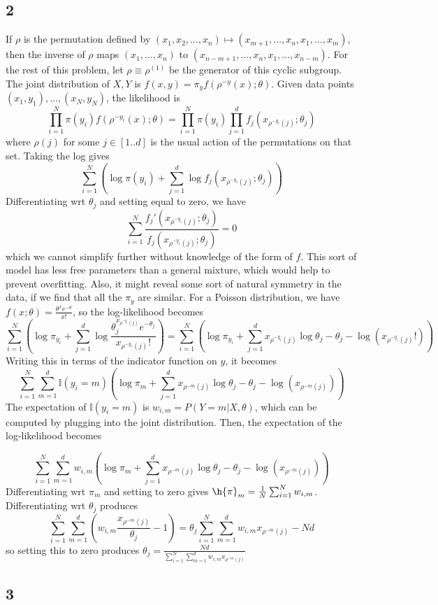\documentclass{article}
\begin{document}
\subsection*{2}
If $\rho$ is the permutation defined by $(x_1,x_2,\ldots,x_n)\mapsto(x_{m+1},\ldots,x_n,x_1,\ldots,x_m)$, then the inverse of $\rho$ maps $(x_1,\ldots,x_n)$ to $(x_{n-m+1},\ldots,x_n,x_1,\ldots,x_{n-m})$. For the rest of this problem, let $\rho\equiv\rho^{(1)}$ be the generator of this cyclic subgroup.
The joint distribution of $X,Y$ is $f(x,y)=\pi_yf(\rho^{-y}(x);\theta)$. Given data points $(x_1,y_1),\ldots,(x_N,y_N)$, the likelihood is
\[\prod_{i=1}^N\pi(y_i)f(\rho^{-y_i}(x);\theta)=\prod_{i=1}^N\pi(y_i)\prod_{j=1}^df_j(x_{\rho^{-y_i}(j)};\theta_j)\]
where $\rho(j)$ for some $j\in[1..d]$ is the usual action of the permutations on that set. Taking the log gives
\[\sum_{i=1}^N\left(\log\pi(y_i)+\sum_{j=1}^d\log f_j(x_{\rho^{-y_i}(j)};\theta_j)\right)\]
Differentiating wrt $\theta_j$ and setting equal to zero, we have
\[\sum_{i=1}^N\frac{f_j'(x_{\rho^{-y_i}(j)};\theta_j)}{f_j(x_{\rho^{-y_i}(j)};\theta_j)}=0\]
which we cannot simplify further without knowledge of the form of $f$.
This sort of model has less free parameters than a general mixture, which would help to prevent overfitting. Also, it might reveal some sort of natural symmetry in the data, if we find that all the $\pi_y$ are similar.
For a Poisson distribution, we have $f(x;\theta)=\frac{\theta^xe^{-\theta}}{x!}$, so the log-likelihood becomes
\[\sum_{i=1}^N\left(\log\pi_{y_i}+\sum_{j=1}^d\log \frac{\theta_j^{x_{\rho^{-y_i}(j)}}e^{-\theta_j}}{x_{\rho^{-y_i}(j)}!}\right)
=\sum_{i=1}^N\left(\log\pi_{y_i}+\sum_{j=1}^dx_{\rho^{-y_i}(j)}\log\theta_j-\theta_j-\log(x_{\rho^{-y_i}(j)}!)\right)\]
Writing this in terms of the indicator function on $y$, it becomes
\[\sum_{i=1}^N\sum_{m=1}^d\mathbb{I}(y_i=m)\left(\log\pi_m+\sum_{j=1}^dx_{\rho^{-m}(j)}\log\theta_j-\theta_j-\log(x_{\rho^{-m}(j)})\right)\]
The expectation of $\mathbb{I}(y_i=m)$ is $w_{i,m}=P(Y=m|X,\theta)$, which can be computed by plugging into the joint distribution. Then, the expectation of the log-likelihood becomes

\[\sum_{i=1}^N\sum_{m=1}^dw_{i,m}\left(\log\pi_m+\sum_{j=1}^dx_{\rho^{-m}(j)}\log\theta_j-\theta_j-\log(x_{\rho^{-m}(j)})\right)\]
Differentiating wrt $\pi_m$ and setting to zero gives $\h{\pi}_m=\frac{1}{N}\sum_{i=1}^Nw_{i,m}$. Differentiating wrt $\theta_j$ produces
\[\sum_{i=1}^N\sum_{m=1}^d\left(w_{i,m}\frac{x_{\rho^{-m}(j)}}{\theta_j}-1\right)=\theta_j\sum_{i=1}^N\sum_{m=1}^dw_{i,m}x_{\rho^{-m}(j)}-Nd\]
so setting this to zero produces $\theta_j=\frac{Nd}{\sum_{i=1}^N\sum_{m=1}^dw_{i,m}x_{\rho^{-m}(j)}}$
\subsection*{3}
\end{document}
